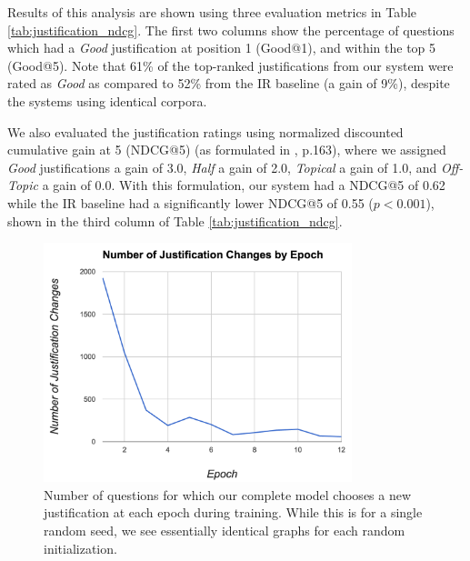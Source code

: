 Results of this analysis are shown using three evaluation metrics in Table \ref{tab:justification_ndcg}.  The first two columns show the percentage of questions which had a \emph{Good} justification at position 1 (Good@1), and within the top 5 (Good@5).  
Note that 61\% of the top-ranked justifications from our system were rated as \emph{Good} as compared to 52\% from the IR baseline (a gain of 9\%), despite the systems using identical corpora.  

We also evaluated the justification ratings using normalized discounted cumulative gain at 5 (NDCG@5) (as formulated in \citet{manning08}, p.163), where we assigned \emph{Good} justifications a gain of 3.0, \emph{Half} a gain of 2.0, \emph{Topical} a gain of 1.0, and \emph{Off-Topic} a gain of 0.0.  With this formulation, our system had a NDCG@5 of 0.62 while the IR baseline had a significantly lower NDCG@5 of 0.55 ($p < 0.001$), shown in the third column of Table \ref{tab:justification_ndcg}. 

\begin{figure}[t]
\begin{center}
\includegraphics[width=0.8\textwidth]{mainmatter/emnlp2017-qaj/justificationChanges.png}
\caption{Number of questions for which %
our complete model chooses a new justification at each epoch during training.  While this is for a single random seed, we see essentially identical graphs for each random initialization.}
\label{fig:changes}
\vspace{-5mm}
\end{center}
\end{figure}

